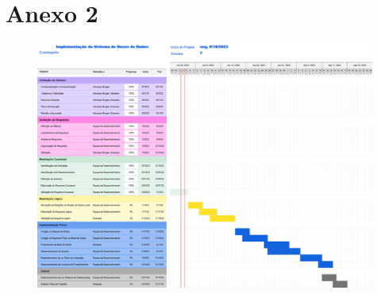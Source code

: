 \documentclass[a4paper,12pt]{scrreprt}
\begin{document}
    \section{Anexo 2} \label{GANTT_c2}
        \begin{figure}[h]
            \centering
            \includegraphics[width=6.2in]{images/GANTT_c2.png}
        \end{figure}
\end{document}
